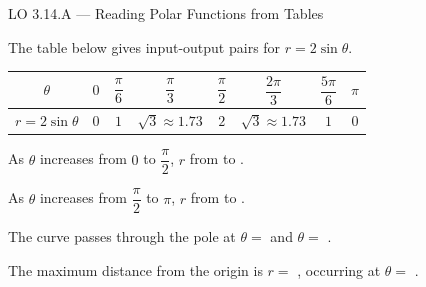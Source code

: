 \documentclass[10pt]{article}
\begin{document}
\begin{notesbox}{LO 3.14.A --- Reading Polar Functions from Tables}

The table below gives input-output pairs for $r = 2\sin\theta$.

\vspace{4pt}
\renewcommand{\arraystretch}{1.5}
\begin{tabular}{|c|c|c|c|c|c|c|c|}
\hline
$\theta$ & $0$ & $\dfrac{\pi}{6}$ & $\dfrac{\pi}{3}$ & $\dfrac{\pi}{2}$ &
           $\dfrac{2\pi}{3}$ & $\dfrac{5\pi}{6}$ & $\pi$ \\
\hline
$r = 2\sin\theta$ & $0$ & $1$ & $\sqrt{3} \approx 1.73$ & $2$ &
                   $\sqrt{3} \approx 1.73$ & $1$ & $0$ \\
\hline
\end{tabular}

\vspace{8pt}
As $\theta$ increases from $0$ to $\dfrac{\pi}{2}$, $r$
 from  to .

\vspace{4pt}
As $\theta$ increases from $\dfrac{\pi}{2}$ to $\pi$, $r$
 from  to .

\vspace{4pt}
The curve passes through the pole at $\theta = $  and $\theta = $ \ans{$\pi$}.

\vspace{4pt}
The maximum distance from the origin is $r = $ ,
occurring at $\theta = $ .

\end{notesbox}

\vspace{0.08in}
\end{document}
